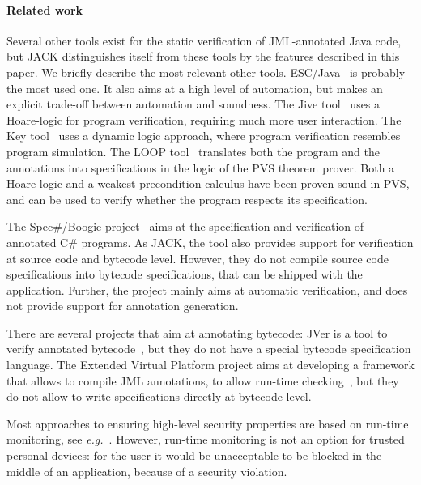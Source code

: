 
\paragraph{Related work}
Several other tools exist for the static verification of JML-annotated
Java code, but JACK distinguishes itself from these tools by the
features described in this paper. We briefly describe the most
relevant other tools. ESC/Java~\cite{CokK04} is probably the most
used one. It also aims at a high level of automation, but makes an
explicit trade-off between automation and soundness. The Jive
tool~\cite{MeyerP00} uses a Hoare-logic for program verification,
requiring much more user interaction. The Key tool~\cite{BeckertHS07}
uses a dynamic logic approach, where program verification resembles
program simulation. The LOOP tool~\cite{BergJ01} translates both the
program and the annotations into specifications in the logic of the
PVS theorem prover. Both a Hoare logic and a weakest precondition
calculus have been proven sound in PVS, and can be used to verify
whether the program respects its specification.

The Spec\#/Boogie project~\cite{SpecSharp04} aims at the specification
and verification of annotated C\# programs. As JACK, the tool also
provides support for verification at source code and bytecode
level. However, they do not compile source code specifications into
bytecode specifications, that can be shipped with the
application. Further, the project mainly aims at automatic
verification, and does not provide support for annotation generation.

There are several projects that aim at annotating bytecode: JVer is a
tool to verify annotated bytecode~\cite{ChanderEILN05}, but they do
not have a special bytecode specification language.  The Extended
Virtual Platform project aims at developing a framework that allows to
compile JML annotations, to allow run-time
checking~\cite{AlagicR05}, but they do not allow to write
specifications directly at bytecode level.

Most approaches to ensuring high-level security properties are based
on run-time monitoring, see
\emph{e.g.}~\/\cite{bartetzko01assertions,Schneider99,Erlingsson03,ColcombetF00}. However,
run-time monitoring is not an option for trusted personal devices: for
the user it would be unacceptable to be blocked in the middle of an
application, because of a security violation.



